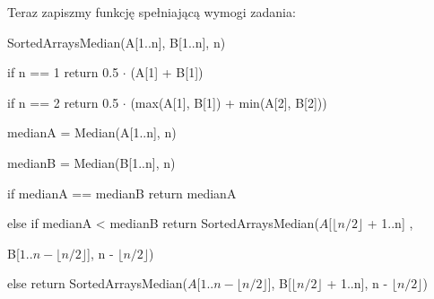 \documentclass{article}
\begin{document}
    \vspace{1\baselineskip}
    Teraz zapiszmy funkcję spełniającą wymogi zadania: \par
    SortedArraysMedian(A[1..n], B[1..n], n) \par
    if n == 1 return 0.5 $\cdot$ (A[1] + B[1]) \par
    if n == 2 return 0.5 $\cdot$ (max(A[1], B[1]) + min(A[2], B[2])) \par
    medianA = Median(A[1..n], n) \par
    medianB = Median(B[1..n], n) \par
    if medianA == medianB return medianA \par
    else if medianA < medianB return SortedArraysMedian($A [\lfloor n/2 \rfloor$ + 1..n] , \par B[$1..n- \lfloor n/2 \rfloor$], n - $\lfloor n/2 \rfloor$) \par
    else return SortedArraysMedian($A [1..n - \lfloor n/2 \rfloor$], B[$\lfloor n/2 \rfloor$ + 1..n], n - $\lfloor n/2 \rfloor$) \par
    
\end{document}
